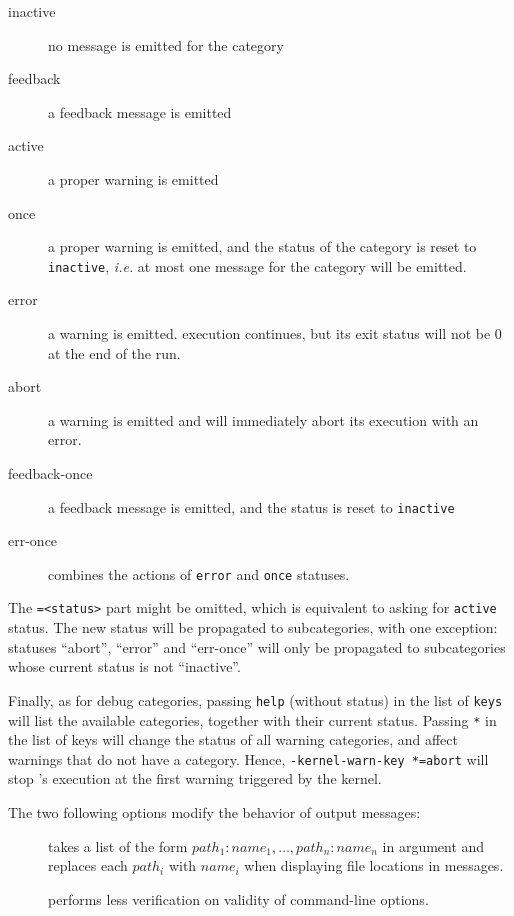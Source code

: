 \begin{description}
\begin{description}
\item[inactive] no message is emitted for the category
\item[feedback] a feedback message is emitted
\item[active] a proper warning is emitted
\item[once] a proper warning is emitted, and the status of the category is
  reset to \texttt{inactive}, {\it i.e.}
  at most one message for the category will be emitted.
\item[error] a warning is emitted. \FramaC execution continues, but its
  exit status will not be 0 at the end of the run.
\item[abort] a warning is emitted and \FramaC will immediately abort
 its execution with an error.
\item[feedback-once] a feedback message is emitted, and the status is reset to
  \texttt{inactive}
\item[err-once] combines the actions of \texttt{error} and \texttt{once}
  statuses.
\end{description}

The \texttt{=<status>} part might be omitted, which is equivalent to asking for \texttt{active} status.
The new status will be propagated to subcategories, with one exception: statuses
``abort'', ``error'' and ``err-once'' will only be propagated to subcategories
whose current status is not ``inactive''.

Finally, as for debug categories, passing \texttt{help} (without status) in the list of
\texttt{keys} will list the available categories, together with their
current status. Passing \texttt{*} in the list of keys will change the status
of all warning categories, and affect warnings that do not have a category.
Hence, \texttt{-kernel-warn-key *=abort} will stop \FramaC's execution at the
first warning triggered by the kernel.
\end{description}

The two following options modify the behavior of output messages:
\begin{description}
\item[] takes a list of the form $path_1:name_1,
  \dots, path_n:name_n$ in argument and replaces each $path_i$ with $name_i$ when
  displaying file locations in messages.
\item[] performs less verification on validity of
  command-line options.
\end{description}

